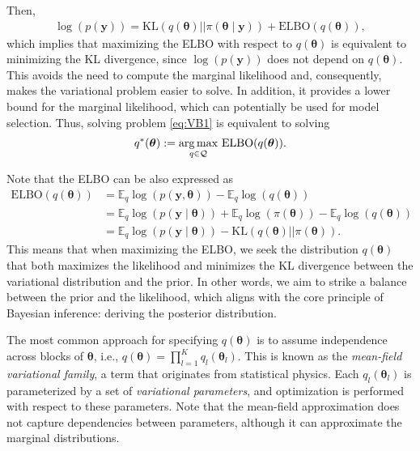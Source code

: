 Then,
\begin{align*}
	\log(p(\boldsymbol{y})) = \text{KL}(q(\boldsymbol{\theta})||\pi(\boldsymbol{\theta} \mid \mathbf{y})) + \text{ELBO}(q(\boldsymbol{\theta})),  
\end{align*} 
which implies that maximizing the ELBO with respect to $q(\boldsymbol{\theta})$ is equivalent to minimizing the KL divergence, since $\log(p(\boldsymbol{y}))$ does not depend on $q(\boldsymbol{\theta})$. This avoids the need to compute the marginal likelihood and, consequently, makes the variational problem easier to solve. In addition, it provides a lower bound for the marginal likelihood, which can potentially be used for model selection. Thus, solving problem \ref{eq:VB1} is equivalent to solving
\begin{align}\label{eq:VB2}
	q^*(\boldsymbol{\theta}):=\underset{q \in \mathcal{Q}}{\argmax} \  \text{ELBO}(q(\boldsymbol{\theta})).
\end{align}

Note that the ELBO can be also expressed as 
\begin{align*}
	\text{ELBO}(q(\boldsymbol{\theta}))&=\mathbb{E}_q\log(p(\boldsymbol{y}, \boldsymbol{\theta}))-\mathbb{E}_q\log(q(\boldsymbol{\theta}))\\
	&=\mathbb{E}_q\log(p(\boldsymbol{y}\mid \boldsymbol{\theta}))+\mathbb{E}_q\log(\pi(\boldsymbol{\theta}))-\mathbb{E}_q\log(q(\boldsymbol{\theta}))\\
	&=\mathbb{E}_q\log(p(\boldsymbol{y}\mid \boldsymbol{\theta}))-\text{KL}(q(\boldsymbol{\theta})||\pi(\boldsymbol{\theta})).
\end{align*} 
This means that when maximizing the ELBO, we seek the distribution $q(\boldsymbol{\theta})$ that both maximizes the likelihood and minimizes the KL divergence between the variational distribution and the prior. In other words, we aim to strike a balance between the prior and the likelihood, which aligns with the core principle of Bayesian inference: deriving the posterior distribution.

The most common approach for specifying $q(\boldsymbol{\theta})$ is to assume independence across blocks of $\boldsymbol{\theta}$, i.e., $q(\boldsymbol{\theta}) = \prod_{l=1}^K q_l(\boldsymbol{\theta}_l)$. This is known as the \textit{mean-field variational family}, a term that originates from statistical physics. Each $q_l(\boldsymbol{\theta}_l)$ is parameterized by a set of \textit{variational parameters}, and optimization is performed with respect to these parameters. Note that the mean-field approximation does not capture dependencies between parameters, although it can approximate the marginal distributions.

